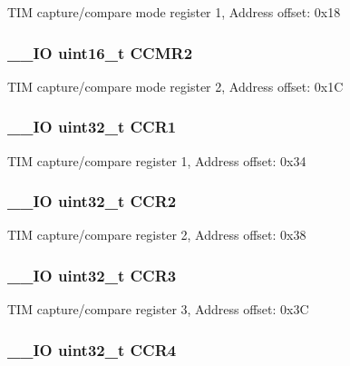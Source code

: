T\-I\-M capture/compare mode register 1, Address offset\-: 0x18 \hypertarget{struct_t_i_m___type_def_a977b3cf310388b5ad02440d64d03810a}{
\subsubsection[{C\-C\-M\-R2}]{\setlength{\rightskip}{0pt plus 5cm}\-\_\-\-\_\-\-I\-O uint16\-\_\-t C\-C\-M\-R2}}\label{struct_t_i_m___type_def_a977b3cf310388b5ad02440d64d03810a}
T\-I\-M capture/compare mode register 2, Address offset\-: 0x1\-C \hypertarget{struct_t_i_m___type_def_adab1e24ef769bbcb3e3769feae192ffb}{
\subsubsection[{C\-C\-R1}]{\setlength{\rightskip}{0pt plus 5cm}\-\_\-\-\_\-\-I\-O uint32\-\_\-t C\-C\-R1}}\label{struct_t_i_m___type_def_adab1e24ef769bbcb3e3769feae192ffb}
T\-I\-M capture/compare register 1, Address offset\-: 0x34 \hypertarget{struct_t_i_m___type_def_ab90aa584f07eeeac364a67f5e05faa93}{
\subsubsection[{C\-C\-R2}]{\setlength{\rightskip}{0pt plus 5cm}\-\_\-\-\_\-\-I\-O uint32\-\_\-t C\-C\-R2}}\label{struct_t_i_m___type_def_ab90aa584f07eeeac364a67f5e05faa93}
T\-I\-M capture/compare register 2, Address offset\-: 0x38 \hypertarget{struct_t_i_m___type_def_a27a478cc47a3dff478555ccb985b06a2}{
\subsubsection[{C\-C\-R3}]{\setlength{\rightskip}{0pt plus 5cm}\-\_\-\-\_\-\-I\-O uint32\-\_\-t C\-C\-R3}}\label{struct_t_i_m___type_def_a27a478cc47a3dff478555ccb985b06a2}
T\-I\-M capture/compare register 3, Address offset\-: 0x3\-C \hypertarget{struct_t_i_m___type_def_a85fdb75569bd7ea26fa48544786535be}{
\subsubsection[{C\-C\-R4}]{\setlength{\rightskip}{0pt plus 5cm}\-\_\-\-\_\-\-I\-O uint32\-\_\-t C\-C\-R4}}\label{struct_t_i_m___type_def_a85fdb75569bd7ea26fa48544786535be}
